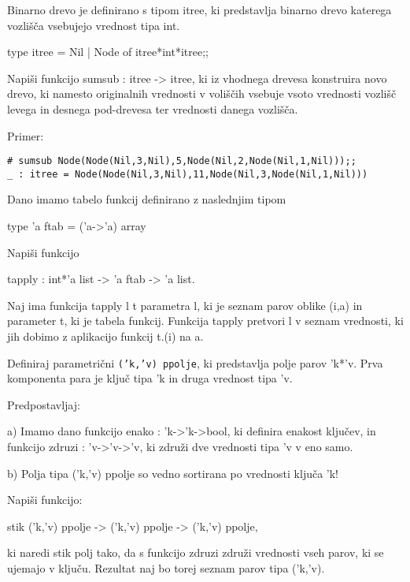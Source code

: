 \begin{ex}
  Binarno drevo je definirano s tipom itree, ki predstavlja binarno
  drevo katerega vozli\v s\v ca vsebujejo vrednost tipa int.

  type itree = Nil | Node of itree*int*itree;;

  Napi\v si funkcijo sumsub : itree -> itree, ki iz vhodnega drevesa
  konstruira novo drevo, ki namesto originalnih vrednosti v voli\v s\v
  cih vsebuje vsoto vrednosti vozli\v s\v c levega in desnega
  pod-drevesa ter vrednosti danega vozli\v s\v ca.

\noindent\/Primer:
\begin{verbatim}
# sumsub Node(Node(Nil,3,Nil),5,Node(Nil,2,Node(Nil,1,Nil)));;
_ : itree = Node(Node(Nil,3,Nil),11,Node(Nil,3,Node(Nil,1,Nil)))
\end{verbatim}


\end{ex} 
\begin{ex}
  Dano imamo tabelo funkcij definirano z naslednjim tipom

  type 'a ftab = ('a->'a) array

  Napi\v si funkcijo

  tapply : int*'a list -> 'a ftab -> 'a list.

  Naj ima funkcija tapply l t parametra l, ki je seznam parov oblike
  (i,a) in parameter t, ki je tabela funkcij. Funkcija tapply pretvori
  l v seznam vrednosti, ki jih dobimo z aplikacijo funkcij t.(i) na a.


\end{ex} 
\begin{ex}
  Definiraj parametri\v cni \texttt{('k,'v) ppolje}, ki predstavlja
  polje parov 'k*'v. Prva komponenta para je klju\v c tipa 'k in druga
  vrednost tipa 'v.

  \noindent\/Predpostavljaj:

  a) Imamo dano funkcijo enako : 'k->'k->bool, ki definira enakost
  klju\v cev, in funkcijo zdruzi : 'v->'v->'v, ki zdru\v zi dve
  vrednosti tipa 'v v eno samo.

  b) Polja tipa ('k,'v) ppolje so vedno sortirana po vrednosti klju\v
  ca 'k!

  Napi\v si funkcijo:

  stik ('k,'v) ppolje -> ('k,'v) ppolje -> ('k,'v) ppolje,

  ki naredi stik polj tako, da s funkcijo zdruzi zdru\v zi vrednosti
  vseh parov, ki se ujemajo v klju\v cu. Rezultat naj bo torej seznam
  parov tipa ('k,'v).


\end{ex}
